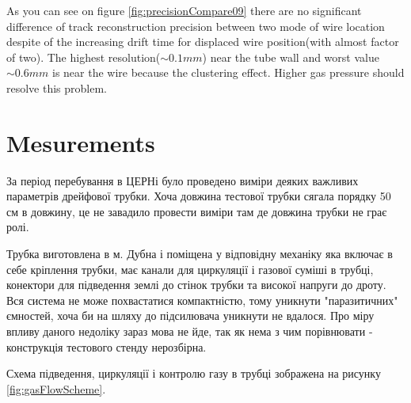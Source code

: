 \documentclass[]{article}
\begin{document}
	As you can see on figure \ref{fig:precisionCompare09} there are no significant difference of track reconstruction precision between two mode of wire location despite of the increasing drift time for displaced wire position(with almost factor of two).	 The highest resolution($\sim 0.1 mm$) near the tube wall and worst value $\sim0.6mm$ is near the wire because the clustering effect. Higher gas pressure should resolve this problem.
		
	\section{Mesurements}
	За період перебування в ЦЕРНі було проведено виміри деяких важливих параметрів дрейфової трубки.	Хоча довжина тестової трубки сягала порядку 50 см в довжину, це не завадило провести виміри там де довжина трубки не грає ролі.
	
	Трубка виготовлена в м. Дубна і поміщена у відповідну механіку яка включає в себе кріплення трубки, має канали для циркуляції і газової суміші в трубці, конектори для підведення землі до стінок трубки та високої напруги до дроту. 
	Вся система не може похвастатися компактністю, тому уникнути "паразитичних" ємностей, хоча би на шляху до підсилювача уникнути не вдалося. Про міру впливу даного недоліку зараз мова не йде, так як нема з чим порівнювати - конструкція тестового стенду нерозбірна.
	
	Схема підведення, циркуляції і контролю газу в трубці зображена на рисунку \ref{fig:gasFlowScheme}.
	
\end{document}
